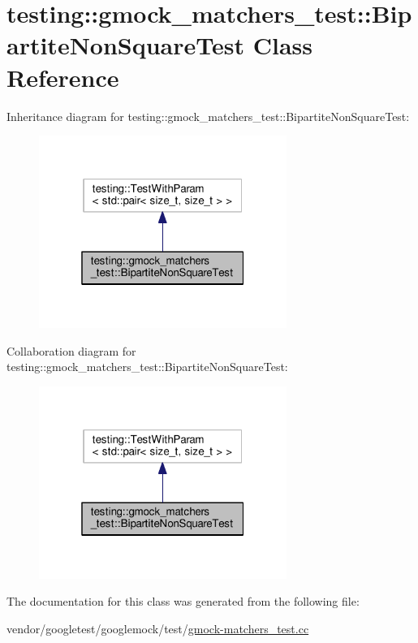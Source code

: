 \hypertarget{classtesting_1_1gmock__matchers__test_1_1BipartiteNonSquareTest}{}\section{testing\+:\+:gmock\+\_\+matchers\+\_\+test\+:\+:Bipartite\+Non\+Square\+Test Class Reference}
\label{classtesting_1_1gmock__matchers__test_1_1BipartiteNonSquareTest}


Inheritance diagram for testing\+:\+:gmock\+\_\+matchers\+\_\+test\+:\+:Bipartite\+Non\+Square\+Test\+:\nopagebreak
\begin{figure}[H]
\begin{center}
\leavevmode
\includegraphics[width=229pt]{classtesting_1_1gmock__matchers__test_1_1BipartiteNonSquareTest__inherit__graph}
\end{center}
\end{figure}


Collaboration diagram for testing\+:\+:gmock\+\_\+matchers\+\_\+test\+:\+:Bipartite\+Non\+Square\+Test\+:\nopagebreak
\begin{figure}[H]
\begin{center}
\leavevmode
\includegraphics[width=229pt]{classtesting_1_1gmock__matchers__test_1_1BipartiteNonSquareTest__coll__graph}
\end{center}
\end{figure}


The documentation for this class was generated from the following file\+:\begin{DoxyCompactItemize}
\item 
vendor/googletest/googlemock/test/\hyperlink{gmock-matchers__test_8cc}{gmock-\/matchers\+\_\+test.\+cc}\end{DoxyCompactItemize}
